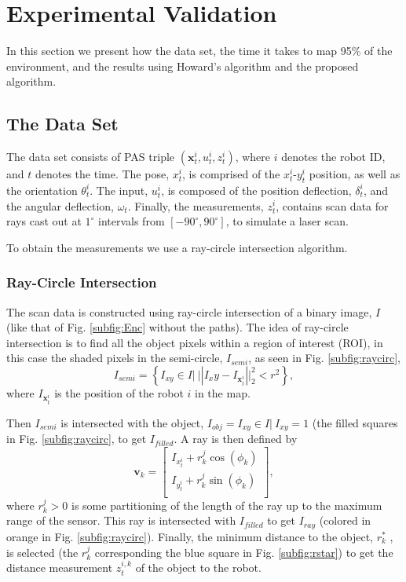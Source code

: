 \section{Experimental Validation}
\label{S:Exp}

In this section we present how the data set, the time it takes to map 95\% of the environment, and the results using Howard's algorithm and the proposed algorithm.  




\subsection{The Data Set}
\label{S:Exp:DataSet}

The data set consists of PAS triple $(\textbf{x}^i_t,u^i_t,z^i_t)$, where $i$ denotes the robot ID, and $t$ denotes the time.  The pose, $x^i_t$, is comprised of the $x_t^i$-$y^i_t$ position, as well as the orientation $\theta^i_t$.  The input, $u^i_t$, is composed of the position deflection, $\delta^i_t$, and the angular deflection, $\omega_t$.  Finally, the measurements, $z^i_t$, contains scan data for rays cast out at $1^\circ$ intervals from $[-90^\circ,90^\circ]$, to simulate a laser scan.  

To obtain the measurements we use a ray-circle intersection algorithm.

\subsubsection{Ray-Circle Intersection}

The scan data is constructed using ray-circle intersection of a binary image, $I$ (like that of Fig. \ref{subfig:Enc} without the paths).  The idea of ray-circle intersection is to find all the object pixels within a region of interest (ROI), in this case the shaded pixels in the semi-circle, $I_{semi}$, as seen in Fig. \ref{subfig:raycirc}, 
\begin{equation}
I_{semi}=\left\{I_{xy}\in I |\  ||I_xy-I_{\textbf{x}_t^i}||_2^2<r^2 \right\},
\label{eq:Isemi}
\end{equation}
where $I_{\textbf{x}_t^i}$ is the position of the robot $i$ in the map.

Then $I_{semi}$ is intersected with the object, $I_{obj}={I_{xy}\in I | \ I_{xy}=1}$ (the filled squares in Fig. \ref{subfig:raycirc}, to get $I_{filled}$.  A ray is then defined by 
\begin{equation}
\textbf{v}_k=\begin{bmatrix}
I_{x_t^i}+r_k^j \cos(\phi_k)\\
I_{y_t^i}+r_k^j \sin(\phi_k)\\
\end{bmatrix}, 
\label{eq:ray}
\end{equation}
where $r_k^j>0$ is some partitioning of the length of the ray up to the maximum range of the sensor.  This ray is intersected with $I_{filled}$ to get $I_{ray}$ (colored in orange in Fig. \ref{subfig:raycirc}).  Finally, the minimum distance to the object, $r_{k}^*$ , is selected (the $r_k^j$ corresponding the blue square in Fig. \ref{subfig:rstar}) to get the distance measurement $z_t^{i,k}$ of the object to the robot.  

